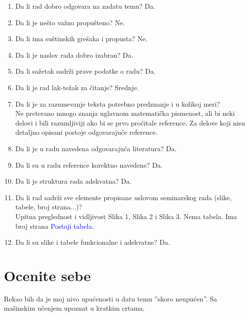 \documentclass[a4paper]{report}
\newcommand{\odgovor}[1]{\textcolor{blue}{#1}}
\begin{document}
\begin{enumerate}
\item Da li rad dobro odgovara na zadatu temu? Da.\\
\item Da li je nešto važno propušteno? Ne.\\
\item Da li ima suštinskih grešaka i propusta? Ne.\\
\item Da li je naslov rada dobro izabran? Da.\\
\item Da li sažetak sadrži prave podatke o radu?  Da.\\
\item Da li je rad lak-težak za čitanje?  Srednje.\\
\item Da li je za razumevanje teksta potrebno predznanje i u kolikoj meri?\\ Ne
preterano mnogo znanja uglavnom matematička pismenost, ali bi neki delovi i bili razumljiviji ako bi se prvo pročitale reference. Za
delove koji nisu detaljno opisani postoje odgovarajuće reference.\\
\item Da li je u radu navedena odgovarajuća literatura?  Da.\\
\item Da li su u radu reference korektno navedene?  Da.\\
\item Da li je struktura rada adekvatna?  Da.\\
\item Da li rad sadrži sve elemente propisane uslovom seminarskog rada (slike, tabele, broj strana...)?\\
Upitna preglednost i vidljivost Slika 1, Slika 2 i Slika 3. Nema tabela. Ima broj strana    \odgovor{Postoji tabela.} \\
\item Da li su slike i tabele funkcionalne i adekvatne? Da.\\
\end{enumerate}

\section{Ocenite sebe}
Rekao bih da je moj nivo upućenosti u datu temu ”skoro neupućen”.
Sa mašinskim učenjem upoznat u kratkim crtama.
\end{document}
